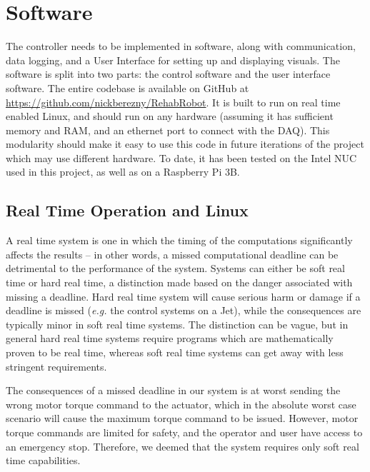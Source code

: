 \documentclass[12pt]{report}
\begin{document}
	\section{Software} \label{sec:software} 

	The controller needs to be implemented in software, along with communication, data logging, and a User Interface for setting up and displaying visuals. The software is split into two parts: the control software and the user interface software. The entire codebase is available on GitHub at \href{https://github.com/nickberezny/RehabRobot}{https://github.com/nickberezny/RehabRobot}. It is built to run on real time enabled Linux, and should run on any hardware (assuming it has sufficient memory and RAM, and an ethernet port to connect with the DAQ). This modularity should make it easy to use this code in future iterations of the project which may use different hardware. To date, it has been tested on the Intel NUC used in this project, as well as on a Raspberry Pi 3B. 
	

	

	\subsection{Real Time Operation and Linux}
	
%

A real time system is one in which the timing of the computations significantly affects the results \cite{Lewine1991} --  in other words, a missed computational deadline can be detrimental to the performance of the system. Systems can either be soft real time or hard real time, a distinction made based on the danger associated with missing a deadline. Hard real time system will cause serious harm or damage if a deadline is missed (\textit{e.g.} the control systems on a Jet), while the consequences are typically minor in soft real time systems. The distinction can be vague, but in general hard real time systems require programs which are mathematically proven to be real time, whereas soft real time systems can get away with less stringent requirements. 

The consequences of a missed deadline in our system is at worst sending the wrong motor torque command to the actuator, which in the absolute worst case scenario will cause the maximum torque command to be issued. However, motor torque commands are limited for safety, and the operator and user have access to an emergency stop. Therefore, we deemed that the system requires only soft real time capabilities. 
\end{document}

